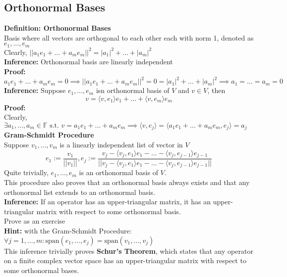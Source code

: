 \documentclass{article}
\newcommand{\F}{\mathbb{F}}
\newcommand{\st}{\mbox{ s.t. }}
\newcommand{\0}{{\bf{0}}}
\begin{document}
\subsection{Orthonormal Bases}
\textbf{Definition: Orthonormal Bases}\\
Basis where all vectors are orthogonal to each other each with norm 1, denoted as $e_1,\dots,e_m$\\
Clearly, $||a_1e_1+\dots+a_me_m||^2=|a_1|^2+\dots+|a_m|^2$\\
\textbf{Inference:} Orthonormal basis are linearly independent\\
\textbf{Proof:}\\
$a_1e_1+\dots+a_me_m=0\implies||a_1e_1+\dots+a_me_m||^2=0=|a_1|^2+\dots+|a_m|^2\implies a_1=\dots=a_m=0$\\
\textbf{Inference:} Suppose $e_1,\dots,e_m$ isn orthonormal basis of $V$ and $v\in V$, then
$$v=\langle v,e_1\rangle e_1+\dots+\langle v,e_m\rangle e_m$$
\textbf{Proof:}\\
Clearly, $\exists a_1,\dots,a_m\in\F\st v=a_1e_1+\dots+a_me_m\implies \langle v,e_j\rangle=\langle a_1e_1+\dots+a_me_m,e_j\rangle=a_j$\\
\textbf{Gram-Schmidt Procedure}\\
Suppose $v_1,\dots,v_m$ is a linearly independent list of vector in $V$
$$e_1:=\dfrac{v_1}{||v_1||},e_j:=\dfrac{v_j-\langle v_j,e_1\rangle e_1-\dots-\langle v_j,e_{j-1}\rangle e_{j-1}}{||v_j-\langle v_j,e_1\rangle e_1-\dots-\langle v_j,e_{j-1}\rangle e_{j-1}||}$$
Quite trivially, $e_1,\dots,e_m$ is an orthonormal basis of $V$.\\
This procedure also proves that an orthonormal basis always exists and that any orthonormal list extends to an orthonormal basis.\\
\textbf{Inference:} If an operator has an upper-triangular matrix, it has an upper-triangular matrix with respect to some orthonormal basis.\\
\null\hfill{Prove as an exercise}\\
\textbf{Hint:} with the Gram-Schmidt Procedure: $\forall j=1,\dots,m:\mbox{span}(e_1,\dots,e_j)=\mbox{span}(v_1,\dots,v_j)$\\
This inference trivially proves \textbf{Schur's Theorem}, which states that any operator on a finite complex vector space has an upper-triangular matrix with respect to some orthonormal bases.
\end{document}
